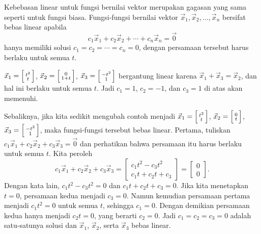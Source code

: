 Kebebasan linear untuk fungsi bernilai vektor merupakan gagasan yang sama seperti
untuk fungsi biasa.
Fungsi-fungsi bernilai vektor
$\vec{x}_1,\vec{x}_2,\ldots,\vec{x}_n$
bersifat bebas linear
apabila
\begin{equation*}
c_1 \vec{x}_1 + c_2 \vec{x}_2 + \cdots + c_n \vec{x}_n  = \vec{0}
\end{equation*}
hanya memiliki solusi $c_1 = c_2 = \cdots = c_n = 0$, dengan persamaan tersebut
harus berlaku untuk semua $t$.

\begin{example}
$\vec{x}_1 = \Bigl[ \begin{smallmatrix} t^2 \\ t \end{smallmatrix} \Bigr]$,
$\vec{x}_2 = \Bigl[ \begin{smallmatrix} 0 \\ 1+t \end{smallmatrix} \Bigr]$,
$\vec{x}_3 = \Bigl[ \begin{smallmatrix} -t^2 \\ 1 \end{smallmatrix} \Bigr]$
bergantung linear karena
$\vec{x}_1 + \vec{x}_3 = \vec{x}_2$, dan hal ini berlaku untuk semua $t$.  Jadi $c_1 =
1$, $c_2 = -1$, dan $c_3 = 1$ di atas akan memenuhi.

Sebaliknya, jika kita sedikit mengubah contoh menjadi
$\vec{x}_1 = \Bigl[ \begin{smallmatrix} t^2 \\ t \end{smallmatrix} \Bigr]$,
$\vec{x}_2 = \Bigl[ \begin{smallmatrix} 0 \\ t \end{smallmatrix} \Bigr]$,
$\vec{x}_3 = \Bigl[ \begin{smallmatrix} -t^2 \\ 1 \end{smallmatrix}
\Bigr]$,
maka fungsi-fungsi tersebut bebas linear.
Pertama, tuliskan
$c_1 \vec{x}_1 + c_2 \vec{x}_2 + c_3 \vec{x}_3  = \vec{0}$ dan perhatikan bahwa persamaan itu
harus berlaku untuk semua $t$.  Kita peroleh
\begin{equation*}
c_1 \vec{x}_1 + c_2 \vec{x}_2 + c_3 \vec{x}_3
=
\begin{bmatrix}
c_1 t^2 - c_3 t^2
\\
c_1 t + c_2 t + c_3
\end{bmatrix}
=
\begin{bmatrix}
0
\\
0
\end{bmatrix} .
\end{equation*}
Dengan kata lain,
$c_1 t^2 - c_3 t^2 = 0$ dan
$c_1 t + c_2 t + c_3 = 0$.
Jika kita menetapkan $t = 0$, persamaan kedua menjadi $c_3 = 0$.  Namun kemudian
persamaan pertama menjadi
$c_1 t^2 = 0$ untuk semua $t$, sehingga $c_1 = 0$.  Dengan demikian persamaan kedua
hanya menjadi $c_2 t = 0$, yang berarti $c_2 = 0$.  Jadi $c_1 = c_2 = c_3 = 0$
adalah satu-satunya solusi dan $\vec{x}_1$,
$\vec{x}_2$, serta $\vec{x}_3$ bebas linear.
\end{example}

